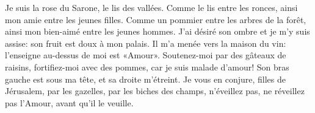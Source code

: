 Je suis la rose du Sarone, le lis des vallées.
Comme le lis entre les ronces, ainsi mon amie entre les jeunes filles.
Comme un pommier entre les arbres de la forêt, ainsi mon bien-aimé entre les jeunes hommes. J’ai désiré son ombre et je m’y suis assise: son fruit est doux à mon palais.
Il m’a menée vers la maison du vin: l’enseigne au-dessus de moi est «Amour».
Soutenez-moi par des gâteaux de raisins, fortifiez-moi avec des pommes, car je suis malade d’amour!
Son bras gauche est sous ma tête, et sa droite m’étreint.
Je vous en conjure, filles de Jérusalem, par les gazelles, par les biches des champs, n’éveillez pas, ne réveillez pas l’Amour, avant qu’il le veuille.
